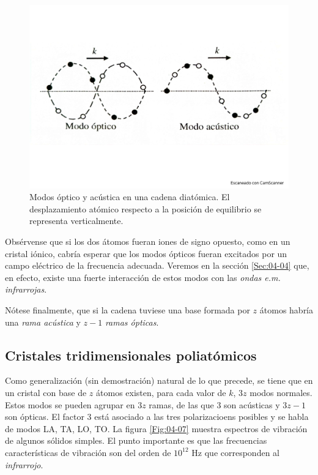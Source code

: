 \begin{figure}[h!] \centering
    \includegraphics[scale=0.37]{Cuerpo/Ch_04/Fotos libro 6.pdf}
    \caption{Modos óptico y acústica en una cadena diatómica. El desplazamiento atómico respecto a la posición de equilibrio se representa verticalmente.}
    \label{Fig:04-06}
\end{figure}    

Obsérvense que si los dos átomos fueran iones de signo opuesto, como en un cristal iónico, cabría esperar que los modos ópticos fueran excitados por un campo eléctrico de la frecuencia adecuada. Veremos en la sección \ref{Sec:04-04} que, en efecto, existe una fuerte interacción de estos modos con las \textit{ondas e.m. infrarrojas}. 

Nótese finalmente, que si la cadena tuviese una base formada por $z$ átomos habría una \textit{rama acústica} y $z-1$ \textit{ramas ópticas}.

\subsection{Cristales tridimensionales poliatómicos}

Como generalización (sin demostración) natural de lo que precede, se tiene que en un cristal con base de $z$ átomos existen, para cada valor de $k$, $3z$ modos normales. Estos modos se pueden agrupar en $3z$ ramas, de las que $3$ son acústicas y $3z-1$ son ópticas. El factor 3 está asociado a las tres polarizacioens posibles y se habla de modos LA, TA, LO, TO. La figura \ref{Fig:04-07} muestra espectros de vibración de algunos sólidos simples. El punto importante es que las frecuencias características de vibración son del orden de $10^{12}$ Hz que corresponden al \textit{infrarrojo}.

